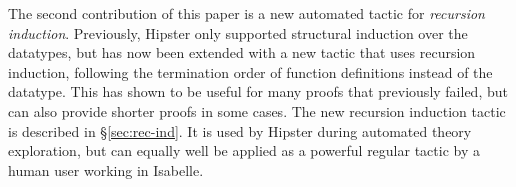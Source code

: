 The second contribution of this paper is a new automated tactic for \emph{recursion induction}. Previously, Hipster only supported structural induction over the datatypes, but has now been extended with a new tactic that uses recursion induction, following the termination order of function definitions instead of the datatype. This has shown to be useful for many proofs that previously failed, but can also provide shorter proofs in some cases. The new recursion induction tactic is described in \S \ref{sec:rec-ind}. It is used by Hipster during automated theory exploration, but can equally well be applied as a powerful regular tactic by a human user working in Isabelle.

  